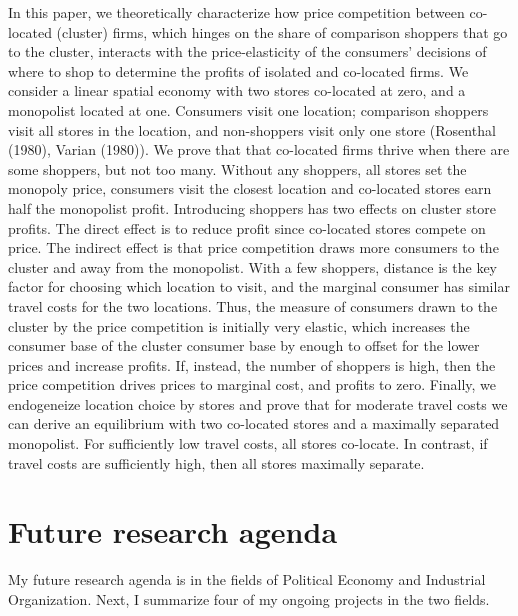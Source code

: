 \documentclass[12pt]{article}
\begin{document}
\noindent
In this paper, we theoretically characterize how price competition between co-located (cluster) firms, which hinges on the share of comparison shoppers that go to the cluster,
interacts with the price-elasticity of the consumers' decisions of where to shop to determine the  profits of  isolated and co-located firms.
We consider a linear spatial economy with two stores co-located at zero, and a monopolist located at one.
Consumers visit one location; comparison shoppers visit all stores in the location, and non-shoppers visit only one store (Rosenthal (1980), Varian (1980)).
We prove that that co-located firms thrive when there are some shoppers, but not too many.
Without any shoppers, all stores set the monopoly price, consumers visit the closest location and co-located stores earn half the monopolist profit.
Introducing shoppers has two effects on cluster store profits.
The direct effect is to reduce profit since co-located stores compete on price.
The indirect effect is that price competition draws more consumers to the cluster and away from the monopolist.
With a few shoppers, distance is the key factor for choosing which location to visit, and the marginal consumer has similar travel costs for the two locations.
Thus, the measure of consumers drawn to the cluster by the price competition is initially very elastic, which increases the consumer base of the cluster consumer base by enough to offset for the lower prices and increase profits.
If, instead, the number of shoppers is high, then the price competition drives prices to marginal cost, and profits to zero.
Finally, we endogeneize location choice by stores and prove that for moderate travel costs we can derive an equilibrium with two co-located stores and a maximally separated monopolist.
For sufficiently low travel costs, all stores co-locate.
In contrast, if travel costs are sufficiently high, then all stores maximally separate.

\vspace{0.25cm}

\section{Future research agenda}
\label{sec:org465af73}

My future research agenda is in the fields of Political Economy and Industrial Organization.
Next, I summarize four of my ongoing projects in the two fields.
\end{document}
